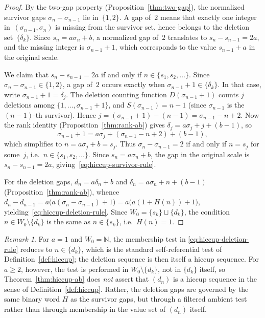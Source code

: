 \documentclass[11pt]{article}
\numberwithin{equation}{section}
\theoremstyle{plain}
\theoremstyle{definition}
\theoremstyle{remark}
\newtheorem{remark}[theorem]{Remark}
\newcommand{\N}{\mathbb{N}}
\begin{document}
\begin{proof}
By the two-gap property (Proposition~\ref{thm:two-gap}), the normalized
survivor gaps $\sigma_n-\sigma_{n-1}$ lie in~$\{1,2\}$.  A gap of~$2$
means that exactly one integer in~$(\sigma_{n-1},\sigma_n)$ is missing
from the survivor set, hence belongs to the deletion set~$\{\delta_k\}$.
Since $s_n=a\sigma_n+b$, a normalized gap of~$2$ translates to
$s_n-s_{n-1}=2a$, and the missing integer is $\sigma_{n-1}+1$, which
corresponds to the value $s_{n-1}+a$ in the original scale.

We claim that $s_n-s_{n-1}=2a$ if and only if $n\in\{s_1,s_2,\ldots\}$.
Since $\sigma_n-\sigma_{n-1}\in\{1,2\}$, a gap of~$2$ occurs exactly when
$\sigma_{n-1}+1\in\{\delta_k\}$.  In that case, write
$\sigma_{n-1}+1=\delta_j$.  The deletion counting function
$D(\sigma_{n-1}+1)$ counts $j$ deletions among $\{1,\ldots,\sigma_{n-1}+1\}$,
and $S(\sigma_{n-1})=n-1$ (since $\sigma_{n-1}$ is the $(n\!-\!1)$-th survivor).
Hence $j=(\sigma_{n-1}+1)-(n-1)=\sigma_{n-1}-n+2$.
Now the rank identity (Proposition~\ref{thm:rank-ab}) gives
$\delta_j=a\sigma_j+j+(b-1)$, so
\[
  \sigma_{n-1}+1 = a\sigma_j + (\sigma_{n-1}-n+2) + (b-1),
\]
which simplifies to $n = a\sigma_j + b = s_j$.  Thus
$\sigma_n-\sigma_{n-1}=2$ if and only if $n=s_j$ for some~$j$, i.e.\
$n\in\{s_1,s_2,\ldots\}$.
Since $s_n=a\sigma_n+b$, the gap in the original scale is
$s_n-s_{n-1}=2a$, giving~\eqref{eq:hiccup-survivor-rule}.

For the deletion gaps, $d_n = a\delta_n+b$ and
$\delta_n = a\sigma_n + n + (b-1)$ (Proposition~\ref{thm:rank-ab}),
whence
$d_n - d_{n-1} = a\bigl(a(\sigma_n-\sigma_{n-1})+1\bigr)
               = a\bigl(a(1+H(n))+1\bigr)$,
yielding~\eqref{eq:hiccup-deletion-rule}.
Since $W_0 = \{s_k\}\sqcup\{d_k\}$, the condition
$n\in W_0\setminus\{d_k\}$ is the same as $n\in\{s_k\}$,
i.e.\ $H(n)=1$.
\end{proof}

\begin{remark}\label{rem:deletions-not-hiccup}
For $a=1$ and $W_0=\N$, the membership test in
\eqref{eq:hiccup-deletion-rule} reduces to $n\in\{d_k\}$, which is the
standard self-referential test of Definition~\ref{def:hiccup}; the deletion
sequence is then itself a hiccup sequence.
For $a\ge2$, however, the test is performed in $W_0\setminus\{d_k\}$, not in
$\{d_k\}$ itself, so Theorem~\ref{thm:hiccup-ab} does \emph{not} assert that
$(d_n)$ is a hiccup sequence in the sense of
Definition~\ref{def:hiccup}.
Rather, the deletion gaps are governed by the same binary word $H$ as the
survivor gaps, but through a filtered ambient test rather than through
membership in the value set of $(d_n)$ itself.
\end{remark}
\end{document}
